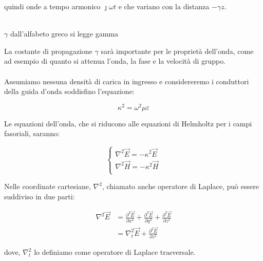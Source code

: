 quindi onde a tempo armonico $\jmath \omega t$ e che variano con la distanza $ - \gamma z$. \\ \\ 


\begin{tcolorbox}
    $\gamma$ dall'alfabeto greco si legge gamma 
\end{tcolorbox}


La costante di propagazione $\gamma$ sarà importante per le proprietà dell'onda, 
come ad esempio di quanto si attenua l'onda, la fase e la velocità di gruppo. \\ \\ 

Assumiamo nessuna densità di carica in ingresso e considereremo i conduttori della guida d'onda soddisfino l'equazione: 

{
    \Large
    \begin{equation}
        \kappa^{2} = \omega^{2} \mu \varepsilon
    \end{equation}
} 

Le equazioni dell'onda, che si riducono alle equazioni di Helmholtz per i campi fasoriali, saranno: 

{
    \Large 
    \begin{equation}
        \begin{cases}
            \nabla ^{2} \vec{E} = - \kappa ^{2}  \vec{E} \\ 
            \nabla ^{2} \vec{H} = - \kappa ^{2}  \vec{H} \\    
        \end{cases}
    \end{equation}
}

Nelle coordinate cartesiane, $\nabla ^{2}$, chiamato anche operatore di Laplace, può essere suddiviso in due parti: 

{
    \Large 
    \begin{equation}
        \begin{split}
            \nabla ^{2} \vec{E} 
            &= \frac{\partial ^{2} \vec{E}}{\partial x ^{2}} + \frac{\partial ^{2} \vec{E}}{\partial y ^{2}} + \frac{\partial ^{2} \vec{E}}{\partial z ^{2}}
            \\
            &= \nabla_t ^{2} \vec{E} + \frac{\partial ^{2} \vec{E}}{\partial z^{2}}  
        \end{split}
    \end{equation}
} 

dove, $\nabla_t ^{2}$ lo definiamo come operatore di Laplace trasversale. \newline 

